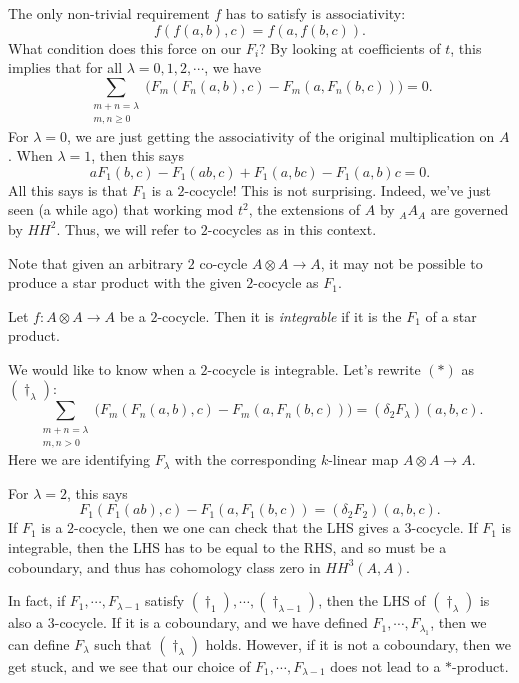 \documentclass[a4paper]{article}
\newcommand\HH{H\!H}
\begin{document}
The only non-trivial requirement $f$ has to satisfy is associativity:
\[
  f(f(a, b), c) = f(a, f(b, c)).
\]
What condition does this force on our $F_i$?  By looking at coefficients of $t$, this implies that for all $\lambda = 0, 1, 2, \cdots$, we have
\[
  \sum_{\substack{m + n = \lambda\\m, n \geq 0}} \Big(F_m(F_n(a, b), c) - F_m(a, F_n(b, c))\Big) = 0.\tag{$*$}
\]
For $\lambda = 0$, we are just getting the associativity of the original multiplication on $A$. When $\lambda = 1$, then this says
\[
  a F_1(b, c) - F_1(ab, c) + F_1(a, bc) - F_1(a, b)c = 0.
\]
All this says is that $F_1$ is a $2$-cocycle! This is not surprising. Indeed, we've just seen (a while ago) that working mod $t^2$, the extensions of $A$ by $_AA_A$ are governed by $\HH^2$. Thus, we will refer to $2$-cocycles as  in this context.

Note that given an arbitrary $2$ co-cycle $A \otimes A \to A$, it may not be possible to produce a star product with the given $2$-cocycle as $F_1$.
\begin{defi}
  Let $f: A \otimes A \to A$ be a $2$-cocycle. Then it is \emph{integrable} if it is the $F_1$ of a star product.
\end{defi}
We would like to know when a $2$-cocycle is integrable. Let's rewrite $(*)$ as $(\dagger_\lambda)$:
\[
  \sum_{\substack{m + n = \lambda\\m, n > 0}}\Big(F_m(F_n(a, b), c) - F_m(a, F_n(b, c))\Big) = (\delta_2 F_\lambda)(a, b, c).\tag{$\dagger_\lambda$}
\]
Here we are identifying $F_\lambda$ with the corresponding $k$-linear map $A \otimes A \to A$.

For $\lambda = 2$, this says
\[
  F_1(F_1(ab), c) - F_1(a, F_1(b, c)) = (\delta_2 F_2)(a, b, c).
\]
If $F_1$ is a $2$-cocycle, then we one can check that the LHS gives a $3$-cocycle. If $F_1$ is integrable, then the LHS has to be equal to the RHS, and so must be a coboundary, and thus has cohomology class zero in $\HH^3(A, A)$.

In fact, if $F_1, \cdots, F_{\lambda - 1}$ satisfy $(\dagger_1), \cdots, (\dagger_{\lambda - 1})$, then the LHS of $(\dagger_\lambda)$ is also a $3$-cocycle. If it is a coboundary, and we have defined $F_1, \cdots, F_{\lambda_1}$, then we can define $F_\lambda$ such that $(\dagger_\lambda)$ holds. However, if it is not a coboundary, then we get stuck, and we see that our choice of $F_1, \cdots, F_{\lambda - 1}$ does not lead to a $*$-product.
\end{document}

